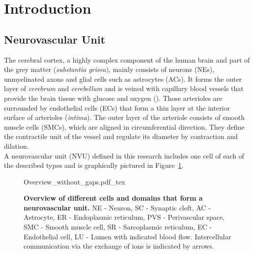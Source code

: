 \section{Introduction}
\subsection{Neurovascular Unit}

The cerebral cortex, a highly complex component of the human brain and part of the grey matter (\textit{substantia grisea}),   mainly consists of neurons (\gls{NE}s), unmyelinated axons and glial cells such as astrocytes (\gls{AC}s). It forms the outer layer of \textit{cerebrum} and \textit{cerebellum} and is veined with capillary blood vessels that provide the brain tissue with glucose and oxygen (\citet{Shipp2007}). Those arterioles are surrounded by endothelial cells (\gls{EC}s) that form a thin layer at the interior surface of arterioles (\textit{intima}). The outer layer of the arteriole consists of smooth muscle cells (\gls{SMC}s), which are  aligned in circumferential direction. They define the contractile unit of the vessel and regulate its diameter by contraction and dilation.\\

A neurovascular unit (\gls{NVU}) defined in this research includes one cell of each of the described types and is graphically pictured in Figure~\ref{Overview1}. \\ 
\begin{figure}[h!]
  \centering
  \def\svgwidth{450pt}
  \scriptsize 
  {Overview_without_gaps.pdf_tex}
  \caption{\textbf{Overview of different cells and domains that form a neurovascular unit.}  \gls{NE} - Neuron, \gls{SC} - Synaptic cleft, \gls{AC}  - Astrocyte,  \gls{ER}  - Endoplasmic reticulum,  \gls{PVS}  - Perivascular space,  \gls{SMC}  - Smooth muscle cell, SR - Sarcoplasmic reticulum,  \gls{EC}  - Endothelial cell,     \gls{LU}  - Lumen with indicated blood flow. Intercellular communication via the exchange of ions is indicated by arrows. }
\label{Overview1}
\end{figure}

